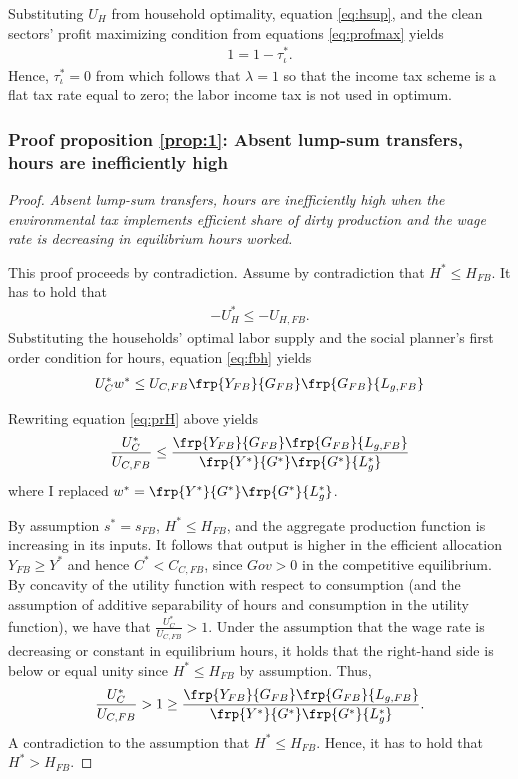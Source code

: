 Substituting $U_H$ from household optimality, equation \ref{eq:hsup}, and the clean sectors' profit maximizing condition from equations \ref{eq:profmax} yields
\begin{align}
1=1-\tau^*_\iota.
\end{align}
Hence, $\tau^*_\iota =0$ from which follows that $\lambda =1$ so that the income tax scheme is a flat tax rate equal to zero; the labor income tax is not used in optimum.



\subsubsection{Proof proposition \ref{prop:1}: Absent lump-sum transfers, hours are inefficiently high}
\begin{proof}\textit{Absent lump-sum transfers, hours are inefficiently high when the environmental tax implements efficient share of dirty production and the wage rate is decreasing in equilibrium hours worked.}
	
	This proof proceeds by contradiction. 
	Assume by contradiction that $H^*\leq H_{FB}$. 
	It has to hold that 
	\begin{align}
	-U_H^*\leq -U_{H,FB}.
	\end{align} 
	Substituting the households' optimal labor supply and the social planner's first order condition for hours, equation \ref{eq:fbh} yields
	\begin{align}\label{eq:prH}
	U_C^*w^* \leq U_{C,FB}\frp{Y_{FB}}{G_{FB}}\frp{G_{FB}}{L_{g,FB}}
	\end{align}
	
	Rewriting equation \ref{eq:prH} above yields
	\begin{align}
	\frac{U_C^*}{U_{C,FB}}\leq \frac{\frp{Y_{FB}}{G_{FB}}\frp{G_{FB}}{L_{g,FB}}}{\frp{Y^*}{G^*}\frp{G^*}{L^*_{g}}}
	\end{align}
	where I replaced $w^*=\frp{Y^*}{G^*}\frp{G^*}{L^*_{g}}$.
	
	By assumption $s^*=s_{FB}$, $H^*\leq H_{FB}$, and the aggregate production function is increasing in its inputs. It follows that output is higher in the efficient allocation $Y_{FB}\geq Y^*$ and hence $C^*<C_{C,FB}$, since $Gov>0$ in the competitive equilibrium. By concavity of the utility function with respect to consumption (and the assumption of additive separability of hours and consumption in the utility function), we have that $\frac{U_C^*}{U_{C,FB}}>1$.
	Under the assumption that the wage rate is decreasing or constant in equilibrium hours, it holds that the right-hand side is below or equal unity since $H^*\leq H_{FB}$ by assumption. Thus,
	\begin{align}
	\frac{U_C^*}{U_{C,FB}}>1\geq \frac{\frp{Y_{FB}}{G_{FB}}\frp{G_{FB}}{L_{g,FB}}}{\frp{Y^*}{G^*}\frp{G^*}{L^*_{g}}}. 
	\end{align}
	A contradiction to the assumption that $H^*\leq H_{FB}$. Hence, it has to hold that $H^*>H_{FB}$. 
\end{proof}


